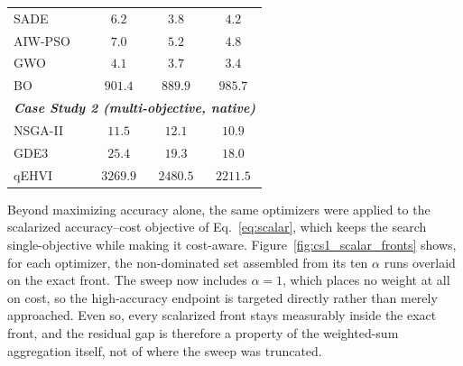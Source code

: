 \documentclass[runningheads]{llncs}
\begin{document}
\begin{table}[!ht]
\begin{tabular}{lccc}
SADE    & \hspace{5mm} $6.2$ & \hspace{5mm} $3.8$ & \hspace{5mm} $4.2$ \\
AIW-PSO & \hspace{5mm} $7.0$ & \hspace{5mm} $5.2$ & \hspace{5mm} $4.8$ \\
GWO     & \hspace{5mm} $4.1$ & \hspace{5mm} $3.7$ & \hspace{5mm} $3.4$ \\
BO      & \hspace{5mm} $901.4$ & \hspace{5mm} $889.9$ & \hspace{5mm} $985.7$ \\
\midrule
\multicolumn{4}{l}{\textit{\textbf{Case Study 2 (multi-objective, native)}}} \\
NSGA-II & \hspace{5mm} $11.5$ & \hspace{5mm} $12.1$ & \hspace{5mm} $10.9$ \\
GDE3    & \hspace{5mm} $25.4$ & \hspace{5mm} $19.3$ & \hspace{5mm} $18.0$ \\
qEHVI   & \hspace{5mm} $3269.9$ & \hspace{5mm} $2480.5$ & \hspace{5mm} $2211.5$ \\
\bottomrule
\end{tabular}
\end{table}

Beyond maximizing accuracy alone, the same optimizers were applied to the scalarized accuracy--cost objective of Eq.~\eqref{eq:scalar}, which keeps the search single-objective while making it cost-aware. Figure~\ref{fig:cs1_scalar_fronts} shows, for each optimizer, the non-dominated set assembled from its ten $\alpha$ runs overlaid on the exact front. The sweep now includes $\alpha=1$, which places no weight at all on cost, so the high-accuracy endpoint is targeted directly rather than merely approached. Even so, every scalarized front stays measurably inside the exact front, and the residual gap is therefore a property of the weighted-sum aggregation itself, not of where the sweep was truncated. 
\end{document}
